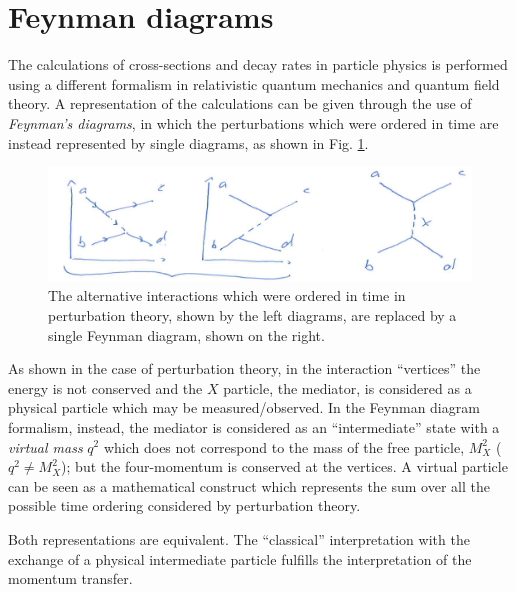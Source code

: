 \section{Feynman diagrams}
The calculations of cross-sections and decay rates in particle physics is performed using a different formalism in relativistic quantum mechanics and quantum field theory. A representation of the calculations can be given through the use of \emph{Feynman's diagrams}, in which the perturbations which were ordered in time are instead represented by single diagrams, as shown in Fig. \ref{quantum-scattering:fig7}.
\begin{figure}[h]
    \centering
    \includegraphics[scale=0.32]{Figures/qscat5}
    \caption{The alternative interactions which were ordered in time in perturbation theory, shown by the left diagrams, are replaced by a single Feynman diagram, shown on the right.}
    \label{quantum-scattering:fig7}
\end{figure}

As shown in the case of perturbation theory, in the interaction ``vertices'' the energy is not conserved and the $X$ particle, the mediator, is considered as a physical particle which may be measured/observed. In the Feynman diagram formalism, instead, the mediator is considered as an ``intermediate'' state with a \emph{virtual mass} $q^2$ which does not correspond to the mass of the free particle, $M_X^2$ ($q^2\neq M_X^2$); but the four-momentum is conserved at the vertices. A virtual particle can be seen as a mathematical construct which represents the sum over all the possible time ordering considered by perturbation theory.

Both representations are equivalent. The ``classical'' interpretation with the exchange of a physical intermediate particle fulfills the interpretation of the momentum transfer.

